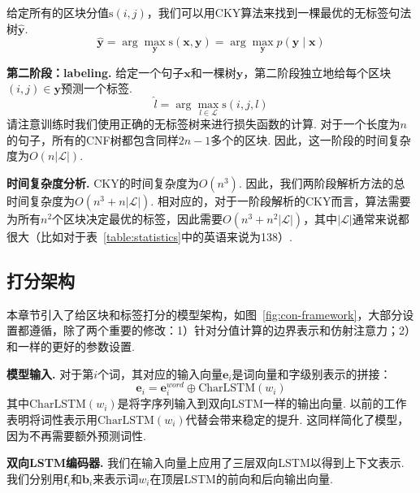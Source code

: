 给定所有的区块分值$\mathrm{s}(i,j)$，我们可以用CKY算法来找到一棵最优的无标签句法树$\hat{\boldsymbol{y}}$.
\begin{equation} \label{eq:tree-argmax}
    \hat{\boldsymbol{y}} = \arg\max_{\boldsymbol{y}} \mathrm{s}(\boldsymbol{x}, \boldsymbol{y}) = \arg\max_{\boldsymbol{y}} p(\boldsymbol{y} \mid \boldsymbol{x})
\end{equation}

\noindent\textbf{第二阶段：labeling.}
给定一个句子$\boldsymbol{x}$和一棵树$\boldsymbol{y}$，第二阶段独立地给每个区块$(i,j) \in \boldsymbol{y}$预测一个标签.
\begin{equation} \label{eq:label-argmax}
    \hat{l} = \arg\max_{l \in \mathcal{L}} \mathrm{s}(i,j,l)
\end{equation}
请注意训练时我们使用正确的无标签树来进行损失函数的计算.
对于一个长度为$n$的句子，所有的CNF树都包含同样$2n-1$多个的区块.
因此，这一阶段的时间复杂度为$O(n|\mathcal{L}|)$.

\noindent\textbf{时间复杂度分析.}
CKY的时间复杂度为$O(n^3)$.
因此，我们两阶段解析方法的总时间复杂度为$O(n^3+n|\mathcal{L}|)$.
相对应的，对于一阶段解析的CKY而言，算法需要为所有$n^2$个区块决定最优的标签，因此需要$O(n^3+n^2|\mathcal{L}|)$，其中$|\mathcal{L}|$通常来说都很大（比如对于表~\ref{table:statistics}中的英语来说为138）.

\subsection{打分架构}

本章节引入了给区块和标签打分的模型架构，如图~\ref{fig:con-framework}，大部分设置都遵循\cite{stern-etal-2017-minimal}，除了两个重要的修改：1）针对分值计算的边界表示和仿射注意力；2）和\cite{Timothy-d17-biaffine}一样的更好的参数设置.

\noindent\textbf{模型输入.}
对于第$i$个词，其对应的输入向量$\mathbf{e}_i$是词向量和字级别表示的拼接：
\begin{equation} \label{eq:token-representation}
    \mathbf{e}_i = \mathbf{e}^{word}_i \oplus \mathrm{CharLSTM}(w_i)
\end{equation}
其中$\mathrm{CharLSTM}(w_i)$是将字序列输入到双向LSTM一样的输出向量\cite{lample-etal-2016-neural}.
以前的工作表明将词性表示用$\mathrm{CharLSTM}(w_i)$代替会带来稳定的提升\cite{kitaev-klein-2018-constituency}.
这同样简化了模型，因为不再需要额外预测词性.

\noindent\textbf{双向LSTM编码器.}
我们在输入向量上应用了三层双向LSTM以得到上下文表示.
我们分别用$\mathbf{f}_i$和$\mathbf{b}_i$来表示词$w_i$在顶层LSTM的前向和后向输出向量.

